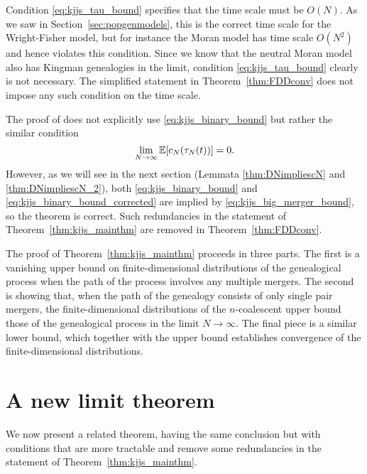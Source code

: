 Condition \eqref{eq:kjjs_tau_bound} specifies that the time scale must be $O(N)$. As we saw in Section~\ref{sec:popgenmodels}, this is the correct time scale for the Wright-Fisher model, but for instance the Moran model has time scale $O(N^2)$ and hence violates this condition. 
Since we know that the neutral Moran model also has Kingman genealogies in the limit, condition \eqref{eq:kjjs_tau_bound} clearly is not necessary. 
The simplified statement in Theorem~\ref{thm:FDDconv} does not impose any such condition on the time scale.

The proof of \textcite{koskela2018} does not explicitly use \eqref{eq:kjjs_binary_bound} but rather the similar condition
\begin{equation}\label{eq:kjjs_binary_bound_corrected}
\lim_{ N \rightarrow \infty } \mathbb{E}[ c_N( \tau_N(t) ) ] = 0 .
\end{equation}
However, as we will see in the next section (Lemmata \ref{thm:DNimpliescN} and \ref{thm:DNimpliescN_2}), both \eqref{eq:kjjs_binary_bound} and \eqref{eq:kjjs_binary_bound_corrected} are implied by \eqref{eq:kjjs_big_merger_bound}, so the theorem is correct. 
Such redundancies in the statement of Theorem~\ref{thm:kjjs_mainthm} are removed in Theorem~\ref{thm:FDDconv}.


The proof of Theorem~\ref{thm:kjjs_mainthm} \parencite[i.e.][Theorem 1]{koskela2018} proceeds in three parts.
The first is a vanishing upper bound on finite-dimensional distributions of the genealogical process when the path of the process involves any multiple mergers.
The second is showing that, when the path of the genealogy consists of only single pair mergers, the finite-dimensional distributions of the $n$-coalescent upper bound those of the genealogical process in the limit $N\to\infty$.
The final piece is a similar lower bound, which together with the upper bound establishes convergence of the finite-dimensional distributions.




\section{A new limit theorem}
We now present a related theorem, having the same conclusion but with conditions that are more tractable and remove some redundancies in the statement of Theorem~\ref{thm:kjjs_mainthm}. 

